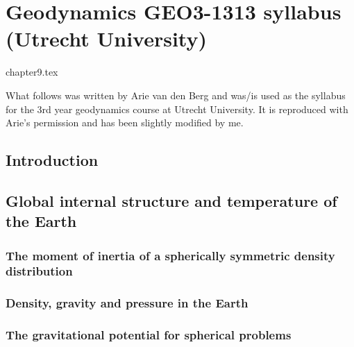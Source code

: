 \chapter{Geodynamics GEO3-1313 syllabus (Utrecht University)} %

\begin{flushright} {\tiny {\color{gray} chapter9.tex}} \end{flushright}


What follows was written by Arie van den Berg and was/is used as the syllabus for the 
3rd year geodynamics course at Utrecht University. It is reproduced with Arie's permission
and has been slightly modified by me.

\section{Introduction} %
\section{Global internal structure and temperature of the Earth} %
\subsection{The moment of inertia of a spherically symmetric density distribution} %
\label{sect_scalarmomint}  %

\newpage
\subsection{Density, gravity and pressure in the Earth} %
\label{section_Density-gravity-pressure}  %

\subsection{The gravitational potential for spherical problems}
  

